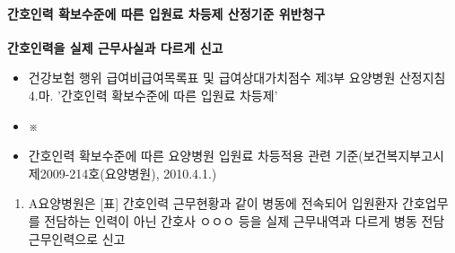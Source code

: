 \paragraph{간호인력 확보수준에 따른 입원료 차등제 산정기준 위반청구}
\textbf{간호인력을 실제 근무사실과 다르게 신고}
\begin{description}\tightlist
\item[관련근거] 
\begin{itemize}\tightlist
\item 건강보험 행위 급여\cntrdot{}비급여목록표 및 급여상대가치점수 제3부 요양병원 산정지침 4.마. '간호인력 확보수준에 따른 입원료 차등제'
\item ※ 
\item 간호인력 확보수준에 따른 요양병원 입원료 차등적용 관련 기준(보건복지부고시 제2009-214호(요양병원), 2010.4.1.)
\end{itemize}

\item[부당사례]
\begin{enumerate}[1)]\tightlist
\item A요양병원은 [표] 간호인력 근무현황과 같이 병동에 전속되어 입원환자 간호업무를 전담하는 인력이 아닌 간호사 ㅇㅇㅇ 등을 실제 근무내역과 다르게 병동 전담 근무인력으로 신고 
\end{enumerate}
\end{description}

